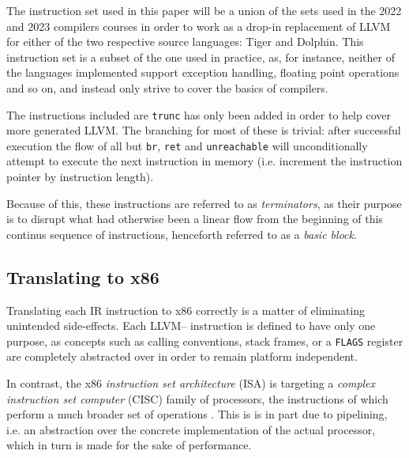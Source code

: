 \documentclass{article}
\begin{document}
The instruction set used in this paper will be a union of the sets used in the 2022 and 2023 compilers courses in order to work as a drop-in replacement of LLVM for either of the two respective source languages:  Tiger and Dolphin. This instruction set is a subset of the one used in practice, as, for instance, neither of the languages implemented support exception handling, floating point operations and so on, and instead only strive to cover the basics of compilers.

The instructions included are
\lstinline!trunc! has only been added in order to help cover more generated LLVM.
The branching for most of these is trivial: after successful execution the flow of all but \lstinline!br!, \lstinline!ret! and \lstinline!unreachable! will unconditionally attempt to execute the next instruction in memory (i.e. increment the instruction pointer by instruction length).

Because of this, these instructions are referred to as \textit{terminators}, as their purpose is to disrupt what had otherwise been a linear flow from the beginning of this continus sequence of instructions, henceforth referred to as a \textit{basic block}.

\subsection{Translating to x86}

Translating each IR instruction to x86 correctly is a matter of eliminating unintended side-effects. Each LLVM-- instruction is defined to have only one purpose, %
as concepts such as calling conventions, stack frames, or a \lstinline!FLAGS! register are completely abstracted over in order to remain platform independent.

In contrast, the x86 \textit{instruction set architecture} (ISA) is targeting a  \textit{complex instruction set computer} (CISC) family of processors, the instructions of which perform a much broader set of operations \cite[p.~190]{tiger}. This is is in part due to pipelining, i.e. an abstraction over the concrete implementation of the actual processor, which in turn is made for the sake of performance.
\end{document}
